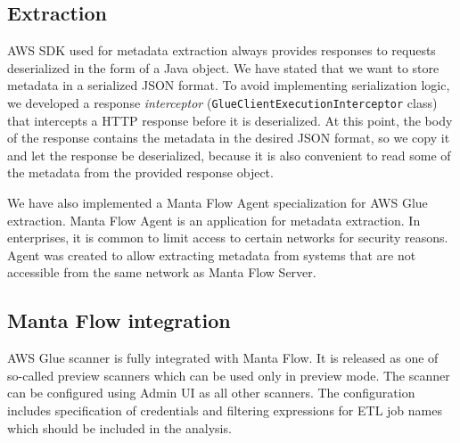\subsection{Extraction}
AWS SDK used for metadata extraction always provides responses to requests deserialized in the form of a Java object. We have stated that we want to store metadata in a serialized JSON format. To avoid implementing serialization logic, we developed a response \textit{interceptor} (\texttt{GlueClientExecutionInterceptor} class) that intercepts a HTTP response before it is deserialized. At this point, the body of the response contains the metadata in the desired JSON format, so we copy it and let the response be deserialized, because it is also convenient to read some of the metadata from the provided response object.
\par
We have also implemented a Manta Flow Agent specialization for AWS Glue extraction. Manta Flow Agent is an application for metadata extraction. In enterprises, it is common to limit access to certain networks for security reasons. Agent was created to allow extracting metadata from systems that are not accessible from the same network as Manta Flow Server.

\subsection{Manta Flow integration}
AWS Glue scanner is fully integrated with Manta Flow. It is released as one of so-called preview scanners which can be used only in preview mode. The scanner can be configured using Admin UI as all other scanners. The configuration includes specification of credentials and filtering expressions for ETL job names which should be included in the analysis.

